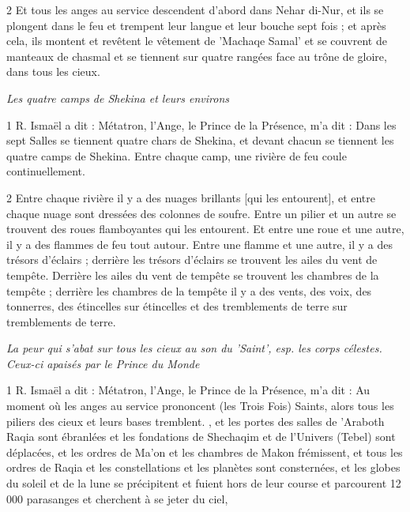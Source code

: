 \par 2 Et tous les anges au service descendent d'abord dans Nehar di-Nur, et ils se plongent dans le feu et trempent leur langue et leur bouche sept fois ; et après cela, ils montent et revêtent le vêtement de 'Machaqe Samal' et se couvrent de manteaux de chasmal et se tiennent sur quatre rangées face au trône de gloire, dans tous les cieux.



\par \textit{Les quatre camps de Shekina et leurs environs}

\par 1 R. Ismaël a dit : Métatron, l'Ange, le Prince de la Présence, m'a dit : Dans les sept Salles se tiennent quatre chars de Shekina, et devant chacun se tiennent les quatre camps de Shekina. Entre chaque camp, une rivière de feu coule continuellement.

\par 2 Entre chaque rivière il y a des nuages ​​brillants [qui les entourent], et entre chaque nuage sont dressées des colonnes de soufre. Entre un pilier et un autre se trouvent des roues flamboyantes qui les entourent. Et entre une roue et une autre, il y a des flammes de feu tout autour. Entre une flamme et une autre, il y a des trésors d'éclairs ; derrière les trésors d'éclairs se trouvent les ailes du vent de tempête. Derrière les ailes du vent de tempête se trouvent les chambres de la tempête ; derrière les chambres de la tempête il y a des vents, des voix, des tonnerres, des étincelles sur étincelles et des tremblements de terre sur tremblements de terre.



\par \textit{La peur qui s'abat sur tous les cieux au son du 'Saint', esp. les corps célestes. Ceux-ci apaisés par le Prince du Monde}

\par 1 R. Ismaël a dit : Métatron, l'Ange, le Prince de la Présence, m'a dit : Au moment où les anges au service prononcent (les Trois Fois) Saints, alors tous les piliers des cieux et leurs bases tremblent. , et les portes des salles de 'Araboth Raqia sont ébranlées et les fondations de Shechaqim et de l'Univers (Tebel) sont déplacées, et les ordres de Ma'on et les chambres de Makon frémissent, et tous les ordres de Raqia et les constellations et les planètes sont consternées, et les globes du soleil et de la lune se précipitent et fuient hors de leur course et parcourent 12 000 parasanges et cherchent à se jeter du ciel,

